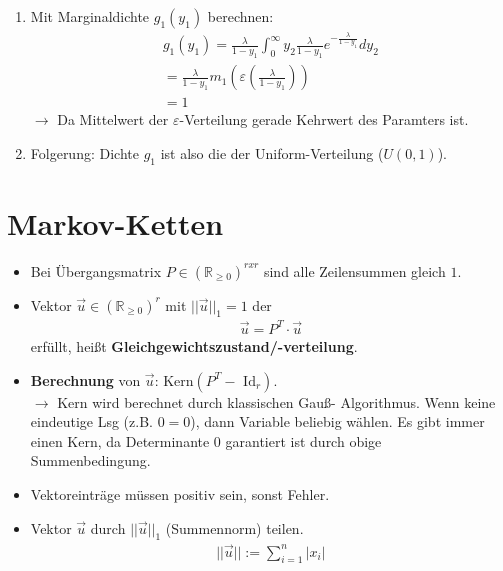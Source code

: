 \documentclass{article}
\begin{document}
\begin{enumerate}
		\item Mit Marginaldichte $g_1(y_1)$ berechnen:\\
		\begin{align}
		g_1(y_1) = \frac{\lambda}{1 - y_1} \int^\infty_0 y_2\frac{\lambda}{1 - y_1}
		e^{-\frac{\lambda}{1 - y_1}} dy_2\\
		= \frac{\lambda}{1 - y_1} m_1 (\varepsilon(\frac{\lambda}{1 - y_1}))\\
		= 1
		\end{align}
		$\longrightarrow$ Da Mittelwert der $\varepsilon$-Verteilung gerade Kehrwert des
		Paramters ist.
		\item Folgerung: Dichte $g_1$ ist also die der Uniform-Verteilung ($U(0,1)$).
	\end{enumerate}
	\section{Markov-Ketten}
	\begin{itemize}
		\item Bei Übergangsmatrix $P \in (\mathbb{R}_{\geq 0})^{r x r}$ sind alle Zeilensummen gleich $1$.
		\item Vektor $\vec{u} \in (\mathbb{R}_{\geq 0})^{r}$ mit $||\vec{u}||_1 = 1$
		der
		\begin{align}
		\vec{u} = P^T \cdot \vec{u}
		\end{align}
		erfüllt, heißt \textbf{Gleichgewichtszustand/-verteilung}.
		\item \textbf{Berechnung} von $\vec{u}$: $\text{Kern}(P^T - \text{ Id}_r)$.\\$\rightarrow$
		Kern wird berechnet durch klassischen Gauß- Algorithmus. Wenn keine
		eindeutige Lsg (z.B. $0 = 0$), dann Variable beliebig wählen. Es gibt
		immer einen Kern, da Determinante $0$ garantiert ist durch obige\\
		Summenbedingung.
		\item Vektoreinträge müssen positiv sein, sonst Fehler.
		\item Vektor $\vec{u}$ durch $||\vec{u}||_1$ (Summennorm) teilen.
		\begin{align}
		||\vec{u}|| := \sum^n_{i=1}|x_i|
		\end{align}
	\end{itemize}
\end{document}
